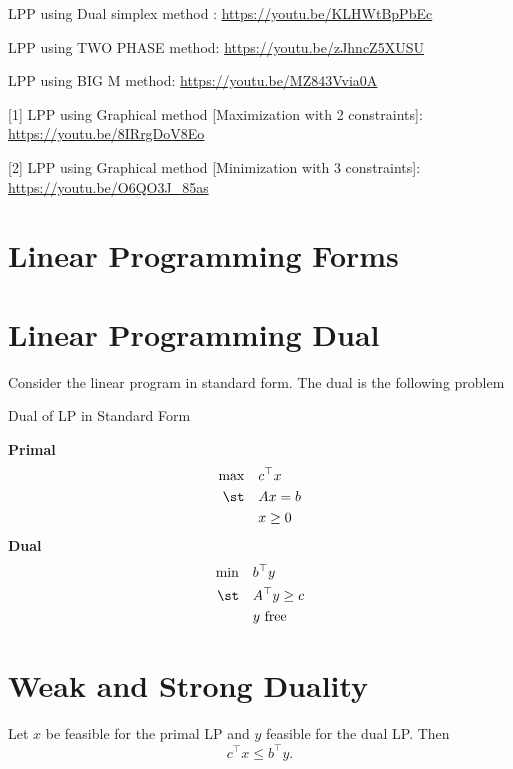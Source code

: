 LPP using Dual simplex method : \url{https://youtu.be/KLHWtBpPbEc}

LPP using TWO PHASE method: \url{https://youtu.be/zJhncZ5XUSU}

LPP using BIG M method: \url{https://youtu.be/MZ843Vvia0A}

[1] LPP using Graphical method [Maximization with 2 constraints]: \url{https://youtu.be/8IRrgDoV8Eo}

[2] LPP using Graphical method [Minimization with 3 constraints]: \url{https://youtu.be/O6QO3J_85as}


\section{Linear Programming Forms}

\section{Linear Programming Dual}
Consider the linear program in standard form.  The dual is the following problem

\begin{general}{Dual of LP in Standard Form}{\polynomial}


\begin{multicols}{2}
\textbf{Primal}
\begin{equation*}
\begin{split}
\max \quad & c^\top x\\
\st \quad & A x = b\\
& x \geq 0
\end{split}
\end{equation*}
\break
\textbf{Dual}
\begin{equation}
\begin{split}
\min \quad & b^\top y\\
\st \quad & A^\top y \geq c\\
& y \text{ free }
\end{split}
\end{equation}
\end{multicols}
\end{general}

\section{Weak and Strong Duality}
\begin{theorem}
Let $x$ be feasible for the primal LP and $y$ feasible for the dual LP.  Then 
\begin{equation}
c^\top x \leq b^\top y.
\end{equation}
\end{theorem}

